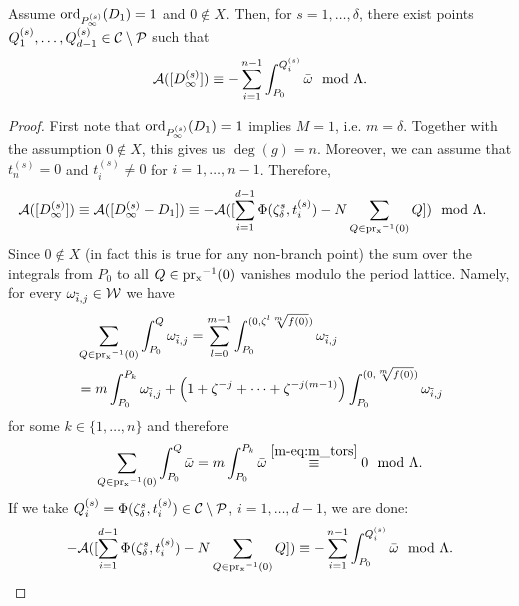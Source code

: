 \documentclass[main.tex]{subfiles}
\begin{document}
  \begin{thm}\label{thm:ajm_inf_ord1}
    Assume $\operatorname{ord}_{P_{\infty}^{(s)}}(D_1) = 1$ and $0 \not\in X$. Then, for $s = 1,\dots,\delta$, there exist points $Q_1^{(s)},\dots,Q_{d-1}^{(s)} \in \mathcal{C} \setminus \mathcal{P}$ such that
    \begin{equation}\label{eq:ajm_inf_ord1}
       \mathcal{A}( [D_{\infty}^{(s)}] ) \equiv -\sum_{i = 1}^{n-1} \int_{P_0}^{Q_i^{(s)}} \bar{\omega} \mod \Lambda.
    \end{equation}
  \end{thm}
  \begin{proof}
    First note that $\operatorname{ord}_{P_{\infty}^{(s)}}(D_1) = 1$ implies $M = 1$, i.e. $m = \delta$. Together with the assumption
    $0 \not\in X$, this gives us $\deg(g) = n$.
    Moreover, we can assume that $t_n^{(s)} = 0$ and $t_i^{(s)} \ne 0$ for $i=1,\dots,n-1$.
    Therefore,
    \begin{align*}
      \mathcal{A}( [D_{\infty}^{(s)}] )  & \equiv  \mathcal{A}([D_{\infty}^{(s)} - D_1])  
      \equiv  -\mathcal{A}( [\sum_{i = 1}^{d-1} \Phi(\zeta_{\delta}^s,t_i^{(s)}) - N \sum_{Q \in \operatorname{pr_x}^{-1}(0)} Q  ] )
       \mod \Lambda.
    \end{align*}
    Since  $0 \not\in X$ (in fact this is true for any non-branch point) the sum over the integrals from $P_0$ to all $Q \in \operatorname{pr_x}^{-1}(0)$ vanishes modulo the period lattice. 
    Namely, for every $\omega_{\tilde{i},j} \in \mathcal{W}$ we have
    \begin{align*}
      & \sum_{Q \in \operatorname{pr_x}^{-1}(0)} \int_{P_0}^Q \omega_{\tilde{i},j} =  \sum_{l=0}^{m-1} \int_{P_0}^{(0,\zeta^l \sqrt[m]{f(0)})} \omega_{\tilde{i},j} \\
    & = m \int_{P_0}^{P_k} \omega_{\tilde{i},j} + \left(1 + \zeta^{-j} + \dots + \zeta^{-j(m-1)}\right) \int_{P_0}^{(0,\sqrt[m]{f(0)})} \omega_{\tilde{i},j}
    \end{align*}
    for some $k \in \{1,\dots,n\}$ and therefore
    \begin{equation*}
       \sum_{Q \in \operatorname{pr_x}^{-1}(0)} \int_{P_0}^Q \bar{\omega} =  m \int_{P_0}^{P_k} \bar{\omega} \overset{\eqref{m-eq:m_tors}}{\equiv} 0 \mod \Lambda.
    \end{equation*}
    If we take $Q_i^{(s)} = \Phi(\zeta_{\delta}^s,t_i^{(s)}) \in \mathcal{C} \setminus \mathcal{P}$, $i = 1,\dots,d-1$, we are done:
    \begin{align*}
    -\mathcal{A}( [\sum_{i = 1}^{d-1} \Phi(\zeta_{\delta}^s,t_i^{(s)}) - N \sum_{Q \in \operatorname{pr_x}^{-1}(0)} Q ] ) \equiv 
    -\sum_{i = 1}^{n-1} \int_{P_0}^{Q_i^{(s)}} \bar{\omega} \mod \Lambda.
    \end{align*}
     \end{proof}
    
\end{document}
